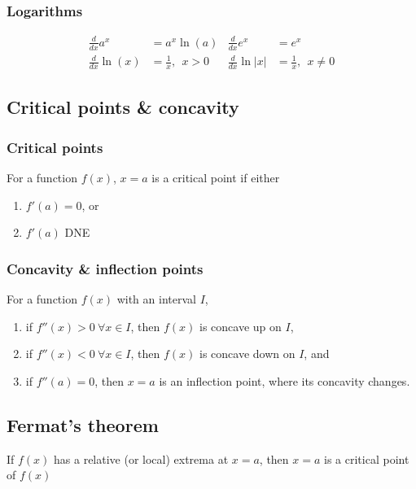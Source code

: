 \documentclass[main.tex]{subfiles}
\begin{document}
\begin{multicols}{2}
	\subsubsection*{Logarithms}
	\begin{align*}
		\frac{d}{dx} a^x &= a^x \ln{(a)} & \frac{d}{dx} e^x &= e^x \\
		\frac{d}{dx} \ln{(x)} &= \frac{1}{x}, \ \ x > 0 & \frac{d}{dx} \ln{|x|} &= \frac{1}{x}, \ \ x \neq 0
	\end{align*}

	\subsection*{Critical points \& concavity}
	\subsubsection*{Critical points}
	For a function \(f(x)\), \(x = a\) is a critical point if either
	\begin{enumerate}
		\item \(f'(a) = 0\), or
		\item \(f'(a)\) DNE
	\end{enumerate}

	\subsubsection*{Concavity \& inflection points}
	For a function \(f(x)\) with an interval \(I\),
	\begin{enumerate}
		\item if \(f''(x) > 0 \ \forall x \in I\), then \(f(x)\) is concave up on \(I\),
		\item if \(f''(x) < 0 \ \forall x \in I\), then \(f(x)\) is concave down on \(I\), and
		\item if \(f''(a) = 0\), then \(x = a\) is an inflection point, where its concavity changes.
	\end{enumerate}

	\subsection*{Fermat's theorem}
	\begin{theorem}
	If \(f(x)\) has a relative (or local) extrema at \(x = a\), then \(x = a\) is a critical point of \(f(x)\)
	\end{theorem}


\end{multicols}
\end{document}
